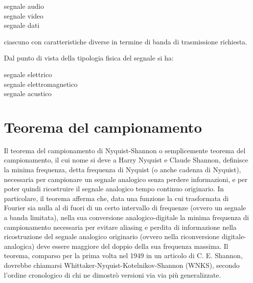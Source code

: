 \begin{description}
\item[segnale audio]
\item[segnale video]
\item[segnale dati]
\end{description}

ciascuno con caratteristiche diverse in termine di banda di trasmissione richiesta.

Dal punto di vista della tipologia fisica del segnale si ha:

\begin{description}
\item[segnale elettrico]
\item[segnale elettromagnetico]
\item[segnale acustico]
\end{description}

%

\clearpage

\section{Teorema del campionamento}

Il teorema del campionamento di Nyquist-Shannon o semplicemente teorema del
campionamento, il cui nome si deve a Harry Nyquist e Claude Shannon, definisce
la minima frequenza, detta frequenza di Nyquist (o anche cadenza di Nyquist),
necessaria per campionare un segnale analogico senza perdere informazioni, e per
poter quindi ricostruire il segnale analogico tempo continuo originario. In
particolare, il teorema afferma che, data una funzione la cui trasformata di
Fourier sia nulla al di fuori di un certo intervallo di frequenze (ovvero un
segnale a banda limitata), nella sua conversione analogico-digitale la minima
frequenza di campionamento necessaria per evitare aliasing e perdita di
informazione nella ricostruzione del segnale analogico originario (ovvero nella
riconversione digitale-analogica) deve essere maggiore del doppio della sua
frequenza massima. Il teorema, comparso per la prima volta nel 1949 in un
articolo di C. E. Shannon, dovrebbe chiamarsi Whittaker-Nyquist-Kotelnikov-Shannon
(WNKS), secondo l'ordine cronologico di chi ne dimostrò versioni via via più
generalizzate.

